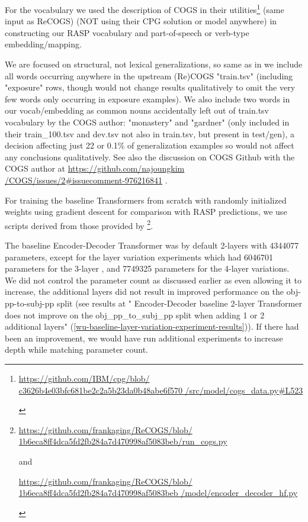 \documentclass[11pt]{article}
\begin{document}
For the vocabulary we used the \cite{klinger2024compositionalprogramgenerationfewshot} description of COGS in their utilities\footnote{\begin{footnotesize}\href{https://github.com/IBM/cpg/blob/c3626b4e03bfc681be2c2a5b23da0b48abe6f570/src/model/cogs_data.py\#L523}{https://github.com/IBM/cpg/blob/
c3626b4e03bfc681be2c2a5b23da0b48abe6f570
/src/model/cogs\_data.py\#L523}
\end{footnotesize}} (same input as ReCOGS) (NOT using their CPG solution or model anywhere) in constructing our RASP vocabulary and part-of-speech or verb-type embedding/mapping. 

We are focused on structural, not lexical generalizations, so same as in \cite{klinger2024compositionalprogramgenerationfewshot} we include all words occurring anywhere in the upstream (Re)COGS "train.tsv" (including "exposure" rows, though would not change results qualitatively to omit the very few words only occurring in exposure examples). We also include two words in our vocab/embedding as common nouns accidentally left out of train.tsv vocabulary by the COGS author: "monastery" and "gardner" (only included in their train\_100.tsv and dev.tsv not also in train.tsv, but present in test/gen), a decision affecting just 22 or 0.1\% of generalization examples so would not affect any conclusions qualitatively. See also the discussion on COGS Github with the COGS author at 
\href{https://github.com/najoungkim/COGS/issues/2\#issuecomment-976216841}{https://github.com/najoungkim
/COGS/issues/2\#issuecomment-976216841} .

For training the baseline Transformers from scratch with randomly initialized weights using gradient descent for comparison with RASP predictions, we use scripts derived from those provided by \cite{Wu2023}\footnote{\begin{footnotesize}\href{https://github.com/frankaging/ReCOGS/blob/1b6eca8ff4dca5fd2fb284a7d470998af5083beb/run\_cogs.py}{https://github.com/frankaging/ReCOGS/blob/
1b6eca8ff4dca5fd2fb284a7d470998af5083beb/run\_cogs.py}

and

\href{https://github.com/frankaging/ReCOGS/blob/1b6eca8ff4dca5fd2fb284a7d470998af5083beb/model/encoder\_decoder\_hf.py}{https://github.com/frankaging/ReCOGS/blob/
1b6eca8ff4dca5fd2fb284a7d470998af5083beb
/model/encoder\_decoder\_hf.py}\end{footnotesize}}.

The baseline \cite{Wu2023} Encoder-Decoder Transformer was by default 2-layers with 4344077 parameters,
except for the layer variation experiments which had 6046701 parameters for the 3-layer , and 7749325 parameters for the 4-layer variations.
We did not control the parameter count as discussed earlier as even allowing it to increase, the additional layers did not result in improved performance on the obj-pp-to-subj-pp split (see results at "\cite{Wu2023} Encoder-Decoder baseline 2-layer Transformer does not improve on the obj\_pp\_to\_subj\_pp split when adding 1 or 2 additional layers" (\ref{wu-baseline-layer-variation-experiment-results})). If there had been an improvement, we would have run additional experiments to increase depth while matching parameter count.
\end{document}
